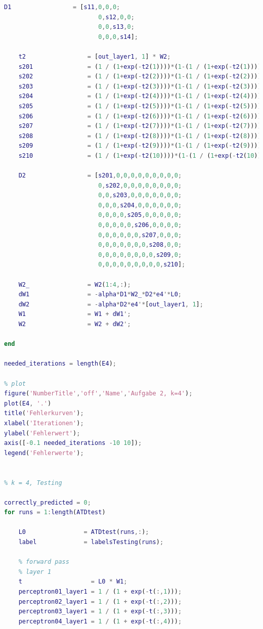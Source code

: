 \documentclass[12pt]{article}
\begin{document}
\begin{lstlisting}[language=Matlab]
    D1                 = [s11,0,0,0;
                          0,s12,0,0;
                          0,0,s13,0;
                          0,0,0,s14];
    
    t2                 = [out_layer1, 1] * W2;
    s201               = (1 / (1+exp(-t2(1))))*(1-(1 / (1+exp(-t2(1)))));
    s202               = (1 / (1+exp(-t2(2))))*(1-(1 / (1+exp(-t2(2)))));
    s203               = (1 / (1+exp(-t2(3))))*(1-(1 / (1+exp(-t2(3)))));
    s204               = (1 / (1+exp(-t2(4))))*(1-(1 / (1+exp(-t2(4)))));
    s205               = (1 / (1+exp(-t2(5))))*(1-(1 / (1+exp(-t2(5)))));
    s206               = (1 / (1+exp(-t2(6))))*(1-(1 / (1+exp(-t2(6)))));
    s207               = (1 / (1+exp(-t2(7))))*(1-(1 / (1+exp(-t2(7)))));
    s208               = (1 / (1+exp(-t2(8))))*(1-(1 / (1+exp(-t2(8)))));
    s209               = (1 / (1+exp(-t2(9))))*(1-(1 / (1+exp(-t2(9)))));
    s210               = (1 / (1+exp(-t2(10))))*(1-(1 / (1+exp(-t2(10)))));
    
    D2                 = [s201,0,0,0,0,0,0,0,0,0;
                          0,s202,0,0,0,0,0,0,0,0;
                          0,0,s203,0,0,0,0,0,0,0;
                          0,0,0,s204,0,0,0,0,0,0;
                          0,0,0,0,s205,0,0,0,0,0;
                          0,0,0,0,0,s206,0,0,0,0;
                          0,0,0,0,0,0,s207,0,0,0;
                          0,0,0,0,0,0,0,s208,0,0;
                          0,0,0,0,0,0,0,0,s209,0;
                          0,0,0,0,0,0,0,0,0,s210];
    
    W2_                = W2(1:4,:);
    dW1                = -alpha*D1*W2_*D2*e4'*L0;
    dW2                = -alpha*D2*e4'*[out_layer1, 1];
    W1                 = W1 + dW1';
    W2                 = W2 + dW2';

end

needed_iterations = length(E4);

% plot
figure('NumberTitle','off','Name','Aufgabe 2, k=4');
plot(E4, '.')
title('Fehlerkurven');
xlabel('Iterationen');
ylabel('Fehlerwert');
axis([-0.1 needed_iterations -10 10]);
legend('Fehlerwerte');


% k = 4, Testing

correctly_predicted = 0;
for runs = 1:length(ATDtest)
    
    L0                = ATDtest(runs,:);
    label             = labelsTesting(runs);
        
    % forward pass
    % layer 1
    t                   = L0 * W1;
    perceptron01_layer1 = 1 / (1 + exp(-t(:,1)));
    perceptron02_layer1 = 1 / (1 + exp(-t(:,2)));
    perceptron03_layer1 = 1 / (1 + exp(-t(:,3)));
    perceptron04_layer1 = 1 / (1 + exp(-t(:,4)));
    

\end{lstlisting}
\end{document}
